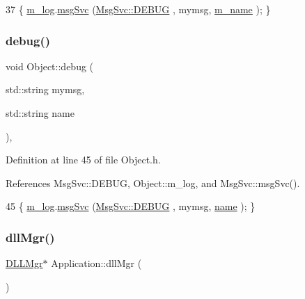 \begin{DoxyCode}
37 \{ \hyperlink{classObject_a0d269813dd7ac1f24bc143031e2963f2}{m\_log}.\hyperlink{classMsgSvc_ad25f18047920cc59a314e5098259711c}{msgSvc} (\hyperlink{classMsgSvc_ae671eb7301996cd049d2da8a65925926a1dbdcc82dce88370ec335883c83b38b0}{MsgSvc::DEBUG}   , mymsg, \hyperlink{classObject_a8b83c95c705d2c3ba0d081fe1710f48d}{m\_name} ); \}
\end{DoxyCode}
\mbox{\label{classObject_a6c9a0397ca804e04d675ed05683f5420}} 
\subsubsection{\texorpdfstring{debug()}{debug()}\hspace{0.1cm}{\footnotesize\ttfamily [2/2]}}
{\footnotesize\ttfamily void Object\+::debug (\begin{DoxyParamCaption}\item[{std\+::string}]{mymsg,  }\item[{std\+::string}]{name }\end{DoxyParamCaption})\hspace{0.3cm}{\ttfamily [inline]}, {\ttfamily [inherited]}}



Definition at line 45 of file Object.\+h.



References Msg\+Svc\+::\+D\+E\+B\+UG, Object\+::m\+\_\+log, and Msg\+Svc\+::msg\+Svc().


\begin{DoxyCode}
45 \{ \hyperlink{classObject_a0d269813dd7ac1f24bc143031e2963f2}{m\_log}.\hyperlink{classMsgSvc_ad25f18047920cc59a314e5098259711c}{msgSvc} (\hyperlink{classMsgSvc_ae671eb7301996cd049d2da8a65925926a1dbdcc82dce88370ec335883c83b38b0}{MsgSvc::DEBUG}   , mymsg, \hyperlink{classObject_a300f4c05dd468c7bb8b3c968868443c1}{name} ); \}
\end{DoxyCode}
\mbox{\label{classApplication_a0133c161bf55544f268ca039e174060b}} 
\subsubsection{\texorpdfstring{dll\+Mgr()}{dllMgr()}}
{\footnotesize\ttfamily \hyperlink{classDLLMgr}{D\+L\+L\+Mgr}$\ast$ Application\+::dll\+Mgr (\begin{DoxyParamCaption}{ }\end{DoxyParamCaption})\hspace{0.3cm}{\ttfamily [inline]}}

